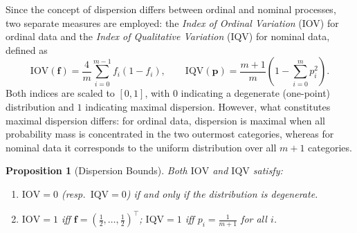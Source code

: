 ﻿\documentclass[12pt,a4paper]{scrreprt}
\newtheorem{proposition}[theorem]{Proposition}
\theoremstyle{definition}
\begin{document}
Since the concept of dispersion differs between ordinal and nominal processes, two separate measures are employed: the \emph{Index of Ordinal Variation} (IOV) for ordinal data and the \emph{Index of Qualitative Variation} (IQV) for nominal data, defined as
\begin{equation*}\label{eq:iov_iqv}
    \mathrm{IOV}(\boldsymbol{f}) = \frac{4}{m}\sum_{i=0}^{m-1}f_i(1-f_i), \qquad
    \mathrm{IQV}(\boldsymbol{p}) = \frac{m+1}{m}\!\left(1-\sum_{i=0}^{m}p_i^2\right).
\end{equation*}
Both indices are scaled to $[0,1]$, with $0$ indicating a degenerate (one-point) distribution and $1$ indicating maximal dispersion. However, what constitutes maximal dispersion differs: for ordinal data, dispersion is maximal when all probability mass is concentrated in the two outermost categories, whereas for nominal data it corresponds to the uniform distribution over all $m+1$ categories.
\begin{proposition}[Dispersion Bounds]\label{prop:dispersion_bounds}
Both $\mathrm{IOV}$ and $\mathrm{IQV}$ satisfy:
\begin{enumerate}
    \item[\normalfont(i)] $\mathrm{IOV}=0$ (resp.\ $\mathrm{IQV}=0$) if and only if
    the distribution is degenerate.
    \item[\normalfont(ii)] $\mathrm{IOV}=1$ iff
    $\boldsymbol{f}=(\tfrac{1}{2},\ldots,\tfrac{1}{2})^\top$;
    $\mathrm{IQV}=1$ iff $p_i=\tfrac{1}{m+1}$ for all $i$.
\end{enumerate}
\end{proposition}
\end{document}
